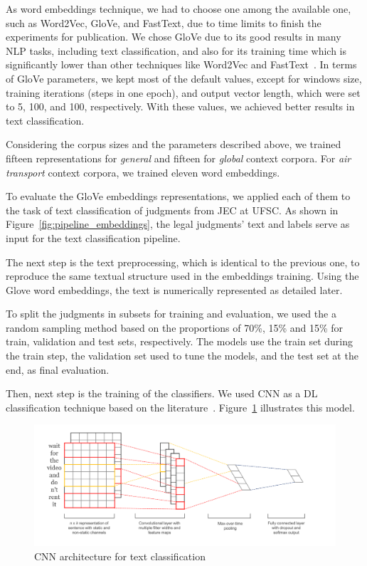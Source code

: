 As word embeddings technique, we had to choose one among the available one, such as Word2Vec, GloVe, and FastText, due to time limits to finish the experiments for publication. We chose GloVe  due to its good results in many \gls{NLP} tasks, including text classification, and also for its training time which is significantly lower than other techniques like Word2Vec and FastText~\cite{Pennington2014}.  
In terms of GloVe parameters, we kept most of the default values, except for windows size, training iterations (steps in one epoch), and output vector length, which were set to 5, 100, and 100, respectively. With these values, we achieved better results in text classification.

Considering the corpus sizes and the parameters described above, we trained fifteen representations for \emph{general} and fifteen for  \emph{global} context corpora. For \textit{air transport} context corpora, we trained eleven word embeddings.

To evaluate the GloVe embeddings representations, we applied each of them to the task of text classification of judgments from \gls{JEC} at \gls{UFSC}. 
As shown in Figure~\ref{fig:pipeline_embeddings}, the legal judgments' text and labels serve as input for the text classification pipeline. 

The next step is the text preprocessing, which is identical to the previous one, to reproduce the same textual structure used in the embeddings training. 
Using the Glove word embeddings, the text is numerically represented as detailed later.

To split the judgments in subsets for training and evaluation, we used the a random sampling method based on the proportions of 70\%, 15\% and 15\% for train, validation and test sets, respectively. The models use the train set during the train step, the validation set used to tune the models, and the test set at the end, as final evaluation.

Then, next step is the training of the classifiers. We used \gls{CNN} as a \gls{DL} classification technique based on the literature~\cite{Kim2014}. Figure~\ref{fig:cnn_model} illustrates this model.

\begin{figure}[htb]
    \centering
    \caption{CNN architecture for text classification}
    \label{fig:cnn_model}
    \includegraphics[width=\textwidth]{images/chapters/cnn_architecture.png}
    
\end{figure}

